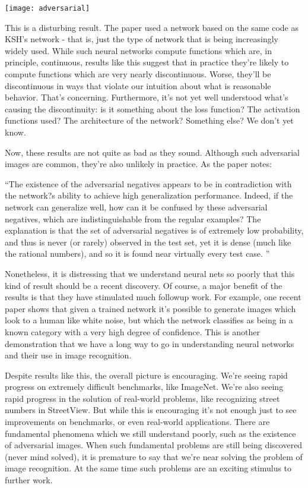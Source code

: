\begin{figure*}[tph]
\texttt{[image: adversarial]}
\end{figure*}


This is a disturbing result. The paper used a network based on the same code as KSH's network - that is, just the type of network that is being increasingly widely used. While such neural networks compute functions which are, in principle, continuous, results like this suggest that in practice they're likely to compute functions which are very nearly discontinuous. Worse, they'll be discontinuous in ways that violate our intuition about what is reasonable behavior. That's concerning. Furthermore, it's not yet well understood what's causing the discontinuity: is it something about the loss function? The activation functions used? The architecture of the network? Something else? We don't yet know.

Now, these results are not quite as bad as they sound. Although such adversarial images are common, they're also unlikely in practice. As the paper notes:

``The existence of the adversarial negatives appears to be in contradiction with the network?s ability to achieve high generalization performance. Indeed, if the network can generalize well, how can it be confused by these adversarial negatives, which are indistinguishable from the regular examples? The explanation is that the set of adversarial negatives is of extremely low probability, and thus is never (or rarely) observed in the test set, yet it is dense (much like the rational numbers), and so it is found near virtually every test case. ''

Nonetheless, it is distressing that we understand neural nets so poorly that this kind of result should be a recent discovery. Of course, a major benefit of the results is that they have stimulated much followup work. For example, one recent paper \cite{NguyenYC14}  shows that given a trained network it's possible to generate images which look to a human like white noise, but which the network classifies as being in a known category with a very high degree of confidence. This is another demonstration that we have a long way to go in understanding neural networks and their use in image recognition.

Despite results like this, the overall picture is encouraging. We're seeing rapid progress on extremely difficult benchmarks, like ImageNet. We're also seeing rapid progress in the solution of real-world problems, like recognizing street numbers in StreetView. But while this is encouraging it's not enough just to see improvements on benchmarks, or even real-world applications. There are fundamental phenomena which we still understand poorly, such as the existence of adversarial images. When such fundamental problems are still being discovered (never mind solved), it is premature to say that we're near solving the problem of image recognition. At the same time such problems are an exciting stimulus to further work.

